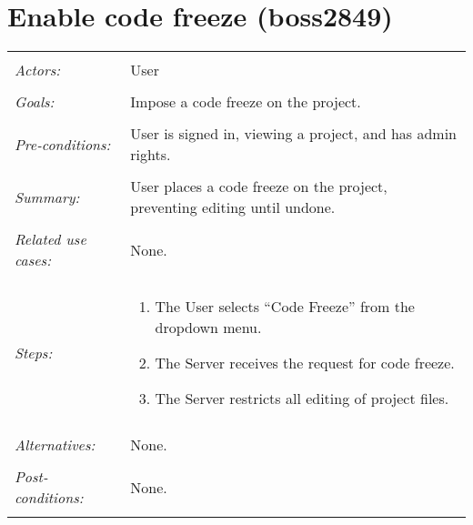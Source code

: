 \documentclass[11pt]{report}
\begin{document}
\section{Enable code freeze (boss2849)}
\begin{tabular}{ p{2cm} p{12cm} }
 \hline
 \\
 \textit{Actors:} & User \\ 
 \\
 \textit{Goals:} & Impose a code freeze on the project. \\
 \\
 \textit{Pre-conditions:} & User is signed in, viewing a project, and has admin rights.\\
 \\
 \textit{Summary:} & User places a code freeze on the project, preventing editing until undone. \\
 \\
 \textit{Related use cases:} & None. \\ 
 \\
 \textit{Steps:} & \begin{enumerate}
  \item The User selects ``Code Freeze'' from the dropdown menu.
  \item The Server receives the request for code freeze.
  \item The Server restricts all editing of project files.
 \end{enumerate} \\
 \\
 \textit{Alternatives:} & None. \\
 \\
 \textit{Post-conditions:} & None. \\
 \\
\hline
\end{tabular}
\end{document}
